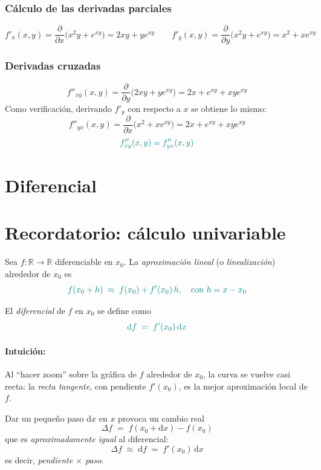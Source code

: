 \documentclass{article}
\begin{document}
\subsubsection*{Cálculo de las derivadas parciales}

\[
f'_x(x,y)
=\frac{\partial}{\partial x}\bigl(x^{2}y + e^{xy}\bigr)
=2xy + ye^{xy}
\qquad
f'_y(x,y)
=\frac{\partial}{\partial y}\bigl(x^{2}y + e^{xy}\bigr)
=x^{2} + xe^{xy}
\]

\subsubsection*{Derivadas cruzadas}

\[
f''_{xy}(x,y)
=\frac{\partial}{\partial y}\bigl(2xy + ye^{xy}\bigr)
=2x + e^{xy} + xye^{xy}
\]
Como verificación, derivando \(f'_y\) con respecto a \(x\) se obtiene lo mismo:
\[
f''_{yx}(x,y)
=\frac{\partial}{\partial x}\bigl(x^{2} + xe^{xy}\bigr)
=2x + e^{xy} + xye^{xy}
\]
\[
\color{teal}
f''_{xy}(x,y)=f''_{yx}(x,y)
\]




\newpage
\section{Diferencial}





\section*{Recordatorio: cálculo univariable}

Sea \(f:\mathbb{R}\to\mathbb{R}\) diferenciable en \(x_0\). La \emph{aproximación lineal} (o \emph{linealización}) alrededor de \(x_0\) es
\[
\color{teal}
f(x_0+h) \;\approx\; f(x_0) + f'(x_0)\,h,
\quad \text{con } h=x-x_0
\]

El \emph{diferencial} de \(f\) en \(x_0\) se define como
\[
\color{teal}
\mathrm{d}f \;=\; f'(x_0)\,\mathrm{d}x
\]

\paragraph*{Intuición:}
Al “hacer zoom” sobre la gráfica de \(f\) alrededor de \(x_0\), la curva se vuelve casi recta: la \emph{recta tangente}, con pendiente \(f'(x_0)\), es la mejor aproximación local de \(f\).

Dar un pequeño paso \(\mathrm{d}x\) en \(x\) provoca un cambio real
\[
\Delta f \;=\; f(x_0+\mathrm{d}x)-f(x_0)
\]
que es \emph{aproximadamente igual} al diferencial:
\[
\Delta f \;\approx\; \mathrm{d}f \;=\; f'(x_0)\,\mathrm{d}x
\]
es decir, {\color{teal}\emph{pendiente \(\times\) paso}}.
\end{document}
